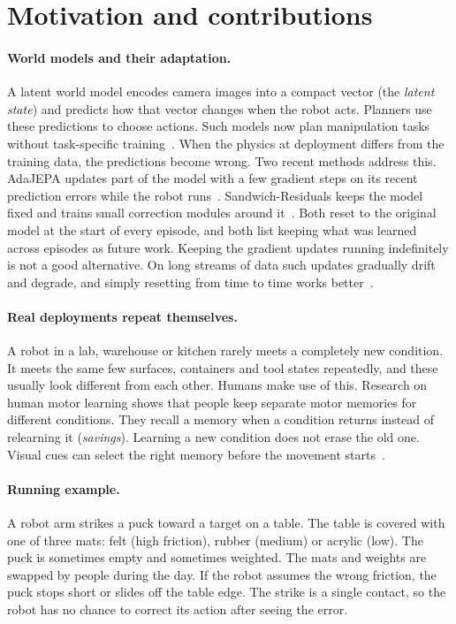 \documentclass[10pt]{article}
\begin{document}
\section{Motivation and contributions}

\paragraph{World models and their adaptation.}
A latent world model encodes camera images into a compact vector (the \emph{latent state}) and
predicts how that vector changes when the robot acts. Planners use these predictions to choose
actions. Such models now plan manipulation tasks without task-specific
training~\cite{zhou2025dinowm,assran2025vjepa2,sobal2025pldm,hansen2024tdmpc2}. When the physics at
deployment differs from the training data, the predictions become wrong. Two recent methods address
this. AdaJEPA updates part of the model with a few gradient steps on its recent prediction errors while
the robot runs~\cite{wang2026adajepa}. Sandwich-Residuals keeps the model fixed and trains small
correction modules around it~\cite{soni2026sandwich}. Both reset to the original model at the start of
every episode, and both list keeping what was learned across episodes as future work. Keeping the
gradient updates running indefinitely is not a good alternative. On long streams of data such updates
gradually drift and degrade, and simply resetting from time to time works better~\cite{press2023rdumb,hoang2024petta}.

\paragraph{Real deployments repeat themselves.}
A robot in a lab, warehouse or kitchen rarely meets a completely new condition. It meets the same few
surfaces, containers and tool states repeatedly, and these usually look different from each other.
Humans make use of this. Research on human motor learning shows that people keep separate motor
memories for different conditions. They recall a memory when a condition returns instead of
relearning it (\emph{savings}). Learning a new condition does not erase the old one. Visual cues can
select the right memory before the movement starts~\cite{heald2021coin,heald2023annurev,haruno2001mosaic}.

\paragraph{Running example.}
A robot arm strikes a puck toward a target on a table. The table is covered with one of three mats:
felt (high friction), rubber (medium) or acrylic (low). The puck is sometimes empty and sometimes
weighted. The mats and weights are swapped by people during the day. If the robot assumes the wrong
friction, the puck stops short or slides off the table edge. The strike is a single contact, so the
robot has no chance to correct its action after seeing the error.
\end{document}
